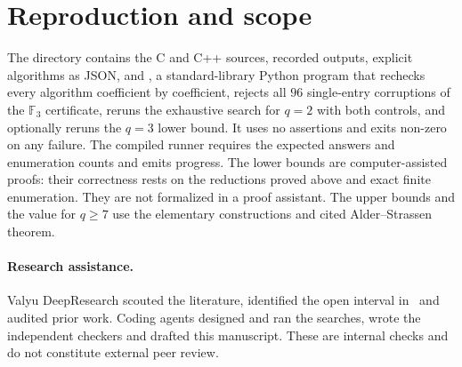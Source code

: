 \documentclass[11pt]{amsart}
\theoremstyle{definition}
\theoremstyle{remark}
\newcommand{\F}{\mathbb F}
\begin{document}
\section{Reproduction and scope}

The directory  contains the C and C++ sources, recorded outputs, explicit algorithms as JSON, and , a standard-library Python program that rechecks every algorithm coefficient by coefficient, rejects all $96$ single-entry corruptions of the $\F_3$ certificate, reruns the exhaustive search for $q=2$ with both controls, and optionally reruns the $q=3$ lower bound. It uses no assertions and exits non-zero on any failure. The compiled runner requires the expected answers and enumeration counts and emits progress. The lower bounds are computer-assisted proofs: their correctness rests on the reductions proved above and exact finite enumeration. They are not formalized in a proof assistant. The upper bounds and the value for $q\ge7$ use the elementary constructions and cited Alder--Strassen theorem.

\paragraph{Research assistance.}
Valyu DeepResearch scouted the literature, identified the open interval in~\cite{Wang2026} and audited prior work. Coding agents designed and ran the searches, wrote the independent checkers and drafted this manuscript. These are internal checks and do not constitute external peer review.



\end{document}
